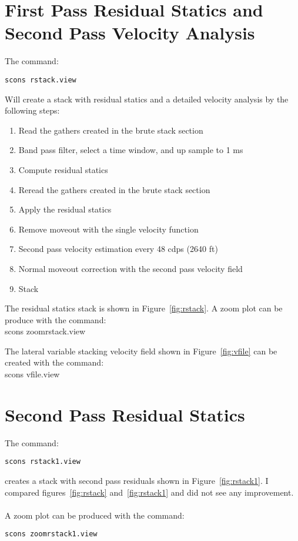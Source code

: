 \section{First Pass Residual Statics and Second Pass Velocity Analysis}
The command:
\begin{verbatim}
scons rstack.view
\end{verbatim}
Will create a stack with residual statics and a detailed velocity analysis 
by the following steps:
\begin{enumerate}
\item Read the gathers created in the brute stack section
\item Band pass filter, select a time window, and up sample to 1 ms
\item Compute residual statics
\item Reread the gathers created in the brute stack section
\item Apply the residual statics
\item Remove moveout with the single velocity function 
\item Second pass velocity estimation every 48 cdps (2640 ft)
\item Normal moveout correction with the second pass velocity field 
\item Stack
\end{enumerate}

The residual statics stack is shown in Figure~\ref{fig:rstack}.  A zoom 
plot can be produce with the command:\\
scons zoomrstack.view


The lateral variable stacking velocity field shown in Figure~\ref{fig:vfile} 
can be created with the command:\\
scons vfile.view


\section{Second Pass Residual Statics}
The command:
\begin{verbatim}
scons rstack1.view
\end{verbatim}
creates a stack with second pass residuals shown in Figure~\ref{fig:rstack1}.  
I compared figures~\ref{fig:rstack} and~\ref{fig:rstack1} and did not see 
any improvement.\\
\\  
A zoom plot can be produced with the command:
\begin{verbatim}
scons zoomrstack1.view
\end{verbatim}

